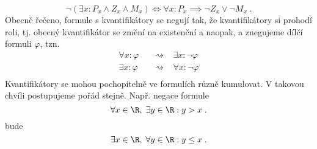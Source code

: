 \begin{equation*}
    \neg(\exists x : P_x\land Z_x \land M_x) \iff \forall x : P_x\implies \neg Z_x \lor \neg M_x\; .
\end{equation*}
Obecně řečeno, formule s kvantifikátory se negují tak, že kvantifikátory si prohodí roli, tj. obecný kvantifikátor se změní na existenční a naopak, a znegujeme dílčí formuli $\varphi$, tzn.
\begin{align*}
    \forall x : \varphi\;\;\;&\rightsquigarrow\;\;\;\exists x : \neg\varphi\\
    \exists x : \varphi\;\;\;&\rightsquigarrow\;\;\;\forall x : \neg\varphi\\
\end{align*}
Kvantifikátory se mohou pochopitelně ve formulích různě kumulovat. V takovou chvíli postupujeme pořád stejně. Např. negace formule
\begin{equation*}
    \forall x\in\R,\;\exists y\in\R : y > x\; .
\end{equation*}
bude
\begin{equation*}
    \exists x\in\R,\;\forall y\in\R : y \leq x\; .
\end{equation*}

